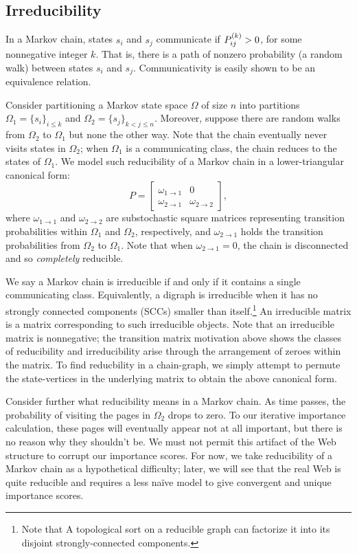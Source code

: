 \documentclass[../exploring-pagerank.tex]{subfiles}
\begin{document}
	\subsection{Irreducibility}
	In a Markov chain, states $s_i$ and $s_j$ communicate if $P^{(k)}_{ij} > 0$, for some nonnegative integer $k$. That is, there is a path of nonzero probability (a random walk) between states $s_i$ and $s_j$. Communicativity is easily shown to be an equivalence relation.

	Consider partitioning a Markov state space $\Omega$ of size $n$ into partitions $\Omega_1 = \{ s_i \}_{i\leq k}$ and $\Omega_2 = \{ s_j \}_{k < j \leq n}$. Moreover, suppose there are random walks from $\Omega_2$ to $\Omega_1$ but none the other way. Note that the chain eventually never visits states in $\Omega_2$; when $\Omega_1$ is a communicating class, the chain reduces to the states of $\Omega_1$. We model such reducibility of a Markov chain in a lower-triangular canonical form:
	\begin{equation*}
	    \label{eqn:reducible}
	    P =
	    \begin{bmatrix}
	        \omega_{1\to 1} & 0 \\
	         \omega_{2 \to 1} & \omega_{2 \to 2}
	    \end{bmatrix},
	\end{equation*}
	where $\omega_{1\to 1}$ and $\omega_{2\to 2}$ are substochastic square matrices representing transition probabilities within $\Omega_1$ and $\Omega_2$, respectively, and $\omega_{2 \to 1}$ holds the transition probabilities from $\Omega_2$ to $\Omega_1$. Note that when $\omega_{2\to 1} = 0$, the chain is disconnected and so \textit{completely} reducible.

	We say a Markov chain is irreducible if and only if it contains a single communicating class. Equivalently, a digraph is irreducible when it has no strongly connected components (SCCs) smaller than itself.\footnote{Note that A topological sort on a reducible graph can factorize it into its disjoint strongly-connected components.} An irreducible matrix is a matrix corresponding to such irreducible objects. Note that an irreducible matrix is nonnegative; the transition matrix motivation above shows the classes of reducibility and irreducibility arise through the arrangement of zeroes within the matrix. To find reducbility in a chain-graph, we simply attempt to permute the state-vertices in the underlying matrix to obtain the above canonical form.

	Consider further what reducibility means in a Markov chain. As time passes, the probability of visiting the pages in $\Omega_2$ drops to zero. To our iterative importance calculation, these pages will eventually appear not at all important, but there is no reason why they shouldn't be. We must not permit this artifact of the Web structure to corrupt our importance scores. For now, we take reducibility of a Markov chain as a hypothetical difficulty; later, we will see that the real Web is quite reducible and requires a less naïve model to give convergent and unique importance scores.
\end{document}
